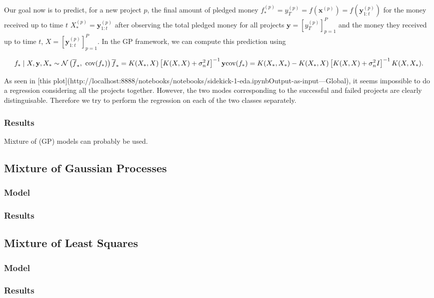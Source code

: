 \documentclass[11pt, oneside]{article}   	%
\begin{document}
        			Our goal now is to predict, for a new project $p$, the final amount of pledged money $f_*^{(p)} = y_T^{(p)} = f(\mathbf{x}^{(p)}) = f(\mathbf{y}_{1:t}^{(p)})$ for the money received up to time $t$ $X_*^{(p)} = \mathbf{y}_{1:t}^{(p)}$ after observing the total pledged money for all projects $\mathbf{y} = \left[y_T^{(p)}\right]_{p=1}^P$ and the money they received up to time $t$, $X = \left[ \mathbf{y}_{1:t}^{(p)} \right]_{p=1}^P$. In the GP framework, we can compute this prediction using
        			 
			 \[f_* \mid X, \mathbf{y}, X_* \sim \mathcal{N}\left(\overline{f}_*, \text{ cov}(f_*)  \right) \\
                            \overline{f}_* = K(X_*, X) \left[ K(X, X) + \sigma_n^2I \right]^{-1}\mathbf{y} \\
                            \text{cov}(f_*) = K(X_*, X_*) - K(X_*, X)\left[ K(X, X) + \sigma_n^2I \right]^{-1}K(X, X_*).
                            \] 

                                   
        			As seen in [this plot](http://localhost:8888/notebooks/notebooks/sidekick-1-eda.ipynbOutput-as-input---Global), it seems impossible to do a regression considering all the projects together. However, the two modes corresponding to the successful and failed projects are clearly distinguisable. Therefore we try to perform the regression on each of the two classes separately. 
        
        		\subsubsection*{Results}
        Mixture of (GP) models can probably be used.
        
         \subsection{Mixture of Gaussian Processes}
         	\subsubsection*{Model}
        		\subsubsection*{Results}
		
         \subsection{Mixture of Least Squares}
         	\subsubsection*{Model}
        		\subsubsection*{Results}    
    
\end{document}
